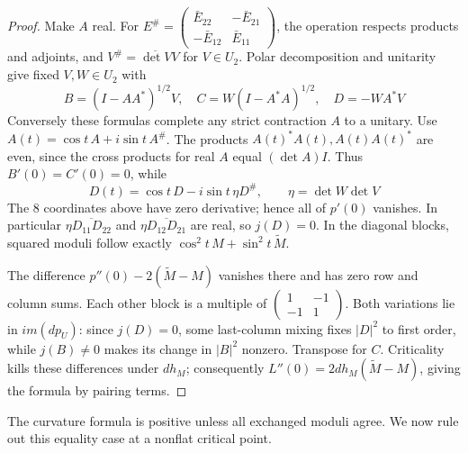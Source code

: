 \documentclass[11pt,a4paper]{article}
\begin{document}
\begin{proof}
Make $A$ real. For $E^\#=\left(\begin{smallmatrix}
\bar E_{22}&-\bar E_{21}\\-\bar E_{12}&\bar E_{11}
\end{smallmatrix}\right)$, the operation respects products and adjoints,
and $V^\#=\overline{\det V}V$ for $V\in U_2$.
Polar decomposition and unitarity give fixed $V,W\in U_2$ with
\[
 B=(I-AA^*)^{1/2}V,\quad C=W(I-A^*A)^{1/2},\quad D=-WA^*V
\]
Conversely these formulas complete any strict contraction $A$ to a
unitary. Use $A(t)=\cos t\,A+i\sin t\,A^\#$.
The products $A(t)^*A(t),A(t)A(t)^*$ are even, since the cross products
for real $A$ equal $(\det A)I$. Thus $B'(0)=C'(0)=0$, while
\[
 D(t)=\cos t\,D-i\sin t\,\eta D^\#,\qquad \eta=\det W\det V
\]
The 8 coordinates above have zero derivative; hence all of $p'(0)$
vanishes. In particular $\eta\overline{D_{11}D_{22}}$ and
$\eta\overline{D_{12}D_{21}}$ are real, so $j(D)=0$.
In the diagonal blocks, squared moduli follow exactly
$\cos^2t\,M+\sin^2t\,\tilde M$.

The difference $p''(0)-2(\tilde M-M)$ vanishes there and has zero
row and column sums. Each other block is a multiple of
$\left(\begin{smallmatrix}1&-1\\-1&1\end{smallmatrix}\right)$.
Both variations lie in $im(dp_U)$: since $j(D)=0$, some
last-column mixing fixes $|D|^2$ to first order, while $j(B)\ne0$
makes its change in $|B|^2$ nonzero. Transpose for $C$.
Criticality kills these differences under $dh_M$; consequently
$L''(0)=2dh_M(\tilde M-M)$, giving the formula by pairing terms.
\end{proof}
The curvature formula is positive unless all exchanged moduli agree.
We now rule out this equality case at a nonflat critical point.
\end{document}
